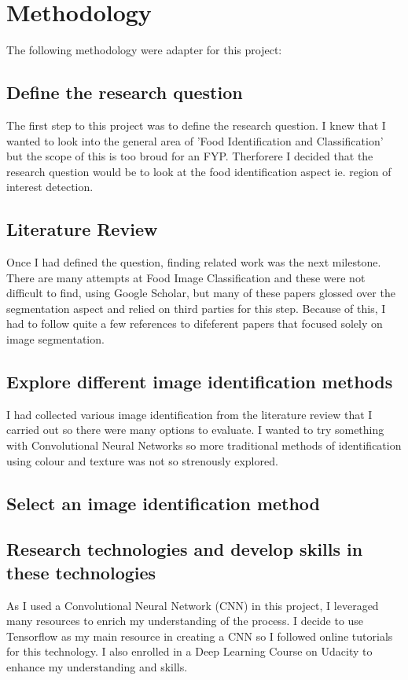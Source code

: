 \section{Methodology}
The following methodology were adapter for this project:

\subsection{ Define the research question}
The first step to this project was to define the research question.
I knew that I wanted to look into the general area of 'Food Identification and Classification' but the scope of this is too broud for an FYP.
Therforere I decided that the research question would be to look at the food identification aspect ie. region of interest detection.

\subsection{ Literature Review}
Once I had defined the question, finding related work was the next milestone.
There are many attempts at Food Image Classification and these were not difficult to find, using Google Scholar, but many of these papers glossed over the segmentation aspect and relied on third parties for this step.
Because of this, I had to follow quite a few references to difeferent papers that focused solely on image segmentation.

\subsection{ Explore different image identification methods}
I had collected various image identification from the literature review that I carried out so there were many options to evaluate.
I wanted to try something with Convolutional Neural Networks so more traditional methods of identification using colour and texture was not so strenously explored.

\subsection{Select an image identification method}

\subsection{Research technologies and develop skills in these technologies}
As I used a Convolutional Neural Network (CNN) in this project, I leveraged many resources to enrich my understanding of the process.
I decide to use Tensorflow as my main resource in creating a CNN so I followed online tutorials for this technology.
I also enrolled in a Deep Learning Course on Udacity to enhance my understanding and skills.

